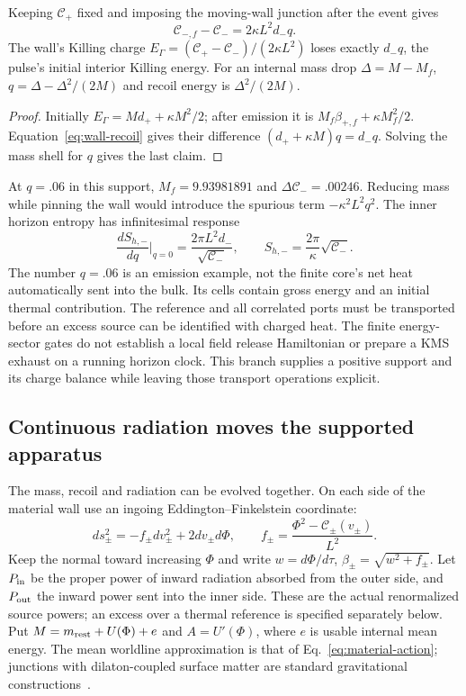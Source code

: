 \begin{proposition}
\label{prop:wall-recoil}
Keeping $\mathcal C_+$ fixed and imposing the moving-wall junction after
the event gives
\begin{equation}\label{eq:wall-source-invariant}
 \mathcal C_{-,f}-\mathcal C_-=2\kappa L^2d_-q.
\end{equation}
The wall's Killing charge
$E_\Gamma=(\mathcal C_+-\mathcal C_-)/(2\kappa L^2)$ loses exactly
$d_-q$, the pulse's initial interior Killing energy.
For an internal mass drop $\Delta=M-M_f$,
$q=\Delta-\Delta^2/(2M)$ and recoil energy is $\Delta^2/(2M)$.
\end{proposition}
\begin{proof}
Initially $E_\Gamma=Md_++\kappa M^2/2$; after emission it is
$M_f\beta_{+,f}+\kappa M_f^2/2$.
Equation~\eqref{eq:wall-recoil} gives their difference
$(d_++\kappa M)q=d_-q$. Solving the mass shell for $q$ gives the last claim.
\end{proof}

At $q=.06$ in this support, $M_f=9.93981891$ and
$\Delta\mathcal C_-=.00246$. Reducing mass while pinning the wall
would introduce the spurious term $-\kappa^2L^2q^2$.
The inner horizon entropy has infinitesimal response
\[
 \frac{dS_{h,-}}{dq}\bigg|_{q=0}
       =\frac{2\pi L^2d_-}{\sqrt{\mathcal C_-}},\qquad
 S_{h,-}=\frac{2\pi}{\kappa}\sqrt{\mathcal C_-}.
\]
The number $q=.06$ is an emission example, not the finite core's net heat
automatically sent into the bulk. Its cells contain gross energy and an
initial thermal contribution. The reference and all correlated ports must
be transported before an excess source can be identified with charged heat.
The finite energy-sector gates do not establish a local field release
Hamiltonian or prepare a KMS exhaust on a running horizon clock.
This branch supplies a positive support and its charge balance while
leaving those transport operations explicit.

\subsection{Continuous radiation moves the supported apparatus}
\label{sec:radiating-support}

The mass, recoil and radiation can be evolved together. On each side of
the material wall use an ingoing Eddington--Finkelstein coordinate:
\[
 ds_\pm^2=-f_\pm dv_\pm^2+2dv_\pm d\Phi,\qquad
 f_\pm=\frac{\Phi^2-\mathcal C_\pm(v_\pm)}{L^2}.
\]
Keep the normal toward increasing $\Phi$ and write
$w=d\Phi/d\tau$, $\beta_\pm=\sqrt{w^2+f_\pm}$.
Let $P_{\rm in}$ be the proper power of inward radiation absorbed from
the outer side, and $P_{\rm out}$ the inward power sent into the inner
side. These are the actual renormalized source powers; an excess
over a thermal reference is specified separately below. Put
$M=m_{\rm rest}+U(\Phi)+e$ and $A=U'(\Phi)$, where $e$ is usable internal
mean energy. The mean worldline approximation is that of
Eq.~\eqref{eq:material-action}; junctions with dilaton-coupled surface
matter are standard gravitational constructions~\cite[Sec.~V]{Shen2024}.

